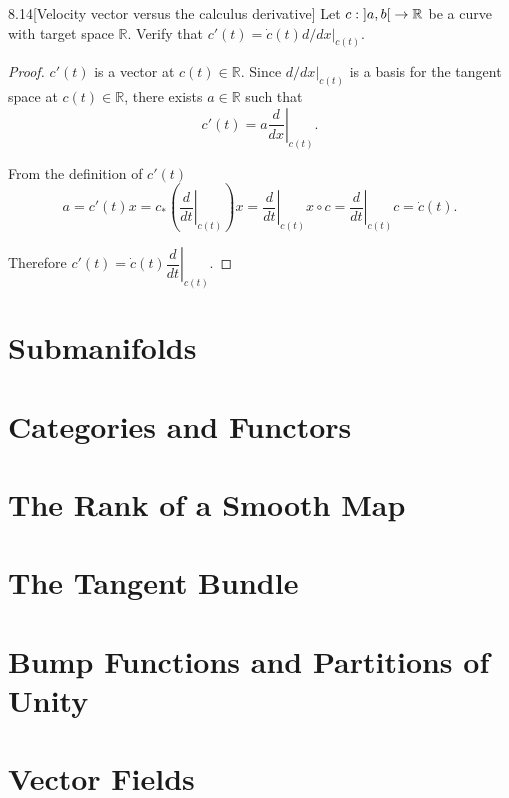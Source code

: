 \begin{exercise}{8.14}[Velocity vector versus the calculus derivative]
	Let \( c: \left]{a, b}\right[ \to \mathbb{R} \) be a curve with target space \( \mathbb{R} \). Verify that \( c'(t) = \dot{c}(t) d/dx\vert_{c(t)} \).
\end{exercise}

\begin{proof}
	\( c'(t) \) is a vector at \( c(t) \in \mathbb{R} \). Since \( d/dx\vert_{c(t)} \) is a basis for the tangent space at \( c(t) \in \mathbb{R} \), there exists \( a\in \mathbb{R} \) such that
	\[
		c'(t) = a\left.\dfrac{d}{dx}\right\vert_{c(t)}.
	\]

	From the definition of \( c'(t) \)
	\[
		a = c'(t)x = c_{\ast}\left(\left.\dfrac{d}{dt}\right\vert_{c(t)}\right)x = \left.\dfrac{d}{dt}\right\vert_{c(t)} x\circ c = \left.\dfrac{d}{dt}\right\vert_{c(t)} c = \dot{c}(t).
	\]

	Therefore \( c'(t) = \dot{c}(t) \left.\dfrac{d}{dt}\right\vert_{c(t)} \).
\end{proof}

\section{Submanifolds}

\section{Categories and Functors}

\section{The Rank of a Smooth Map}

\section{The Tangent Bundle}

\section{Bump Functions and Partitions of Unity}

\section{Vector Fields}
